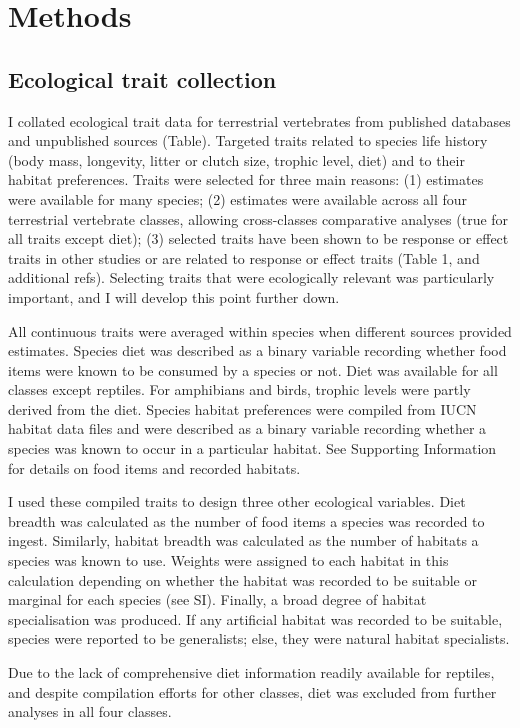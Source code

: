 \section{Methods}

\subsection{Ecological trait collection}
I collated ecological trait data for terrestrial vertebrates from published databases and unpublished sources (Table). Targeted traits related to species life history (body mass, longevity, litter or clutch size, trophic level, diet) and to their habitat preferences. Traits were selected for three main reasons: (1) estimates were available for many species; (2) estimates were available across all four terrestrial vertebrate classes, allowing cross-classes comparative analyses (true for all traits except diet); (3) selected traits have been shown to be response or effect traits in other studies or are related to response or effect traits (Table 1, and additional refs). Selecting traits that were ecologically relevant was particularly important, and I will develop this point further down.

All continuous traits were averaged within species when different sources provided estimates. Species diet was described as a binary variable recording whether food items were known to be consumed by a species or not. Diet was available for all classes except reptiles. For amphibians and birds, trophic levels were partly derived from the diet. Species habitat preferences were compiled from IUCN habitat data files and were described as a binary variable recording whether a species was known to occur in a particular habitat. See Supporting Information for details on food items and recorded habitats.

I used these compiled traits to design three other ecological variables. Diet breadth was calculated as the number of food items a species was recorded to ingest. Similarly, habitat breadth was calculated as the number of habitats a species was known to use. Weights were assigned to each habitat in this calculation depending on whether the habitat was recorded to be suitable or marginal for each species (see SI). Finally, a broad degree of habitat specialisation was produced. If any artificial habitat was recorded to be suitable, species were reported to be generalists; else, they were natural habitat specialists.

Due to the lack of comprehensive diet information readily available for reptiles, and despite compilation efforts for other classes, diet was excluded from further analyses in all four classes.

